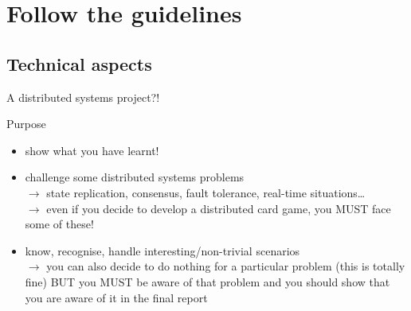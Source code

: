 \documentclass[presentation]{beamer}\mode<presentation>{\usetheme{AMSBolognaFC}}
\begin{document}
\section{Follow the guidelines}
\subsection{Technical aspects}


\begin{frame}[c,allowframebreaks]{A distributed systems project?!}
    
    \begin{block}{Purpose}
        \begin{itemize}
            \item show what you have learnt!
            \item challenge some distributed systems problems
            \\
            $\rightarrow$ state replication, consensus, fault tolerance, real-time situations\dots
            \\
            $\rightarrow$ even if you decide to develop a distributed card game, you \alert{MUST} face some of these!
            \item know, recognise, handle interesting/non-trivial scenarios
            \\
            $\rightarrow$ you can also decide to do nothing for a particular problem (this is totally fine) \alert{BUT} you \alert{MUST} be aware of that problem and you should show that you are aware of it in the final report
        \end{itemize}
    \end{block}
    
    \framebreak
    

\end{frame}
\end{document}
